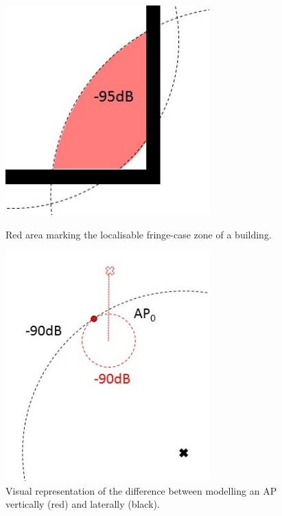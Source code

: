 \documentclass{UoYCSproject}
\begin{document}
                \begin{figure}[h]
                	\centering
                	\begin{minipage}{0.45\textwidth}
                		\centering
                		\includegraphics[width=0.7\textwidth]{fringe.jpg}
                		\caption{Red area marking the localisable fringe-case zone of a building.}
                	\end{minipage}\hfill
                	\begin{minipage}{0.45\textwidth}
                		\centering
                		\includegraphics[width=0.7\textwidth]{vertical.jpg}
                		\caption{Visual representation of the difference between modelling an AP vertically (red) and laterally (black).}
                	\end{minipage}
                \end{figure}
                
\end{document}
